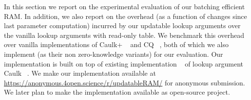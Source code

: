 In this section we report on the experimental evaluation of our batching efficient RAM.
In addition, we also report on the overhead (as a function of changes since last parameter computation)
incurred by our updatable lookup arguments over the vanilla lookup arguments with read-only table. We
benchmark this overhead over vanilla implementations of Caulk+ ~\cite{EPRINT:PosKat22} and
CQ ~\cite{EPRINT:EagFioGab22}, both of which we also implement (as their non zero-knowledge variants)
for our evaluation. Our implementation is built on top of existing implementation ~\cite{caulk-implementation}
of lookup argument Caulk ~\cite{CCS:ZBKMNS22}. We make our implementation available at
\url{https://anonymous.4open.science/r/updatableRAM/} for anonymous submission. We later plan to
make the implementation available as open-source project.
